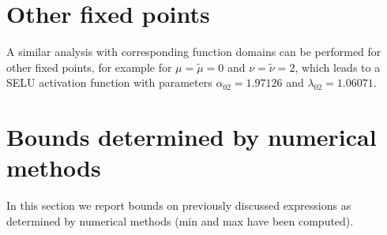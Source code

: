 \documentclass{article}
\newcommand\munn{{\tilde \mu}}
\newcommand\nunn{{\tilde \nu}}
\begin{document}
\clearpage

\section{Other fixed points}
A similar analysis with corresponding function domains can be performed for other fixed points, for example for $\mu=\munn=0$ and $\nu=\nunn=2$, which leads
to a SELU activation function with parameters $\alpha_{\mathrm{02}}=1.97126$ and $\lambda_{\mathrm{02}}=1.06071$. 


\section{Bounds determined by numerical methods}

In this section we report bounds on previously discussed expressions as determined by numerical methods (min and max have been
computed). 
\end{document}
